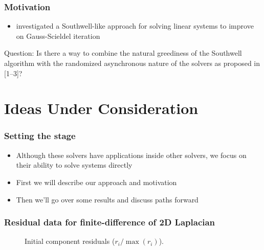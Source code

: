 \documentclass{beamer}
\begin{document}
\begin{frame}
	\frametitle{Motivation}
	\begin{itemize}
		\item \textcite{wolfson2017distributed} investigated  a Southwell-like approach for solving linear systems to improve on Gauss-Scieldel iteration
	\end{itemize}	
	\begin{block}{Question:}
	    Is there a way to combine the natural greediness of the Southwell algorithm with the randomized asynchronous nature of the solvers as proposed in [1--3]?
	\end{block}
\end{frame}


\section{Ideas Under Consideration}

\begin{frame}
	\frametitle{Setting the stage}
	\begin{itemize}
		\item Although these solvers have applications inside other solvers, we focus on their ability to solve systems directly
        \item First we will describe our approach and motivation
        \item Then we'll go over some results and discuss paths forward
	\end{itemize}
\end{frame}

\begin{frame}
	\frametitle{Residual data for finite-difference of 2D Laplacian}
	\begin{figure}[H]
		\centering
		\caption{Initial component residuals ($r_i / \max (r_i)$).}
		\label{fig:initial-residuals-laplacian}
	\end{figure}
\end{frame}
\end{document}
